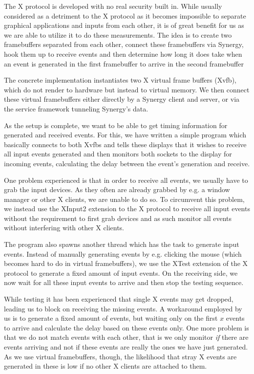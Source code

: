 The X protocol is developed with no real security built in.
While usually considered as a detriment to the X protocol as it becomes impossible to separate graphical applications and inputs from each other, it is of great benefit for us as we are able to utilize it to do these measurements.
The idea is to create two framebuffers separated from each other, connect these framebuffers via Synergy, hook them up to receive events and then determine how long it does take when an event is generated in the first framebuffer to arrive in the second framebuffer

The concrete implementation instantiates two X virtual frame buffers (Xvfb), which do not render to hardware but instead to virtual memory.
We then connect these virtual framebuffers either directly by a Synergy client and server, or via the service framework tunneling Synergy's data.

As the setup is complete, we want to be able to get timing information for generated and received events.
For this, we have written a simple program which basically connects to both Xvfbs and tells these displays that it wishes to receive all input events generated and then monitors both sockets to the display for incoming events, calculating the delay between the event's generation and receive.

One problem experienced is that in order to receive all events, we usually have to grab the input devices.
As they often are already grabbed by e.g. a window manager or other X clients, we are unable to do so.
To circumvent this problem, we instead use the XInput2 extension to the X protocol to receive all input events without the requirement to first grab devices and as such monitor all events without interfering with other X clients.

The program also spawns another thread which has the task to generate input events.
Instead of manually generating events by e.g. clicking the mouse (which becomes hard to do in virtual framebuffers), we use the XTest extension of the X protocol to generate a fixed amount of input events.
On the receiving side, we now wait for all these input events to arrive and then stop the testing sequence.

While testing it has been experienced that single X events may get dropped, leading us to block on receiving the missing events.
A workaround employed by us is to generate a fixed amount of events, but waiting only on the first $x$ events to arrive and calculate the delay based on these events only.
One more problem is that we do not match events with each other, that is we only monitor \emph{if} there are events arriving and not if these events are really the ones we have just generated.
As we use virtual framebuffers, though, the likelihood that stray X events are generated in these is low if no other X clients are attached to them.

